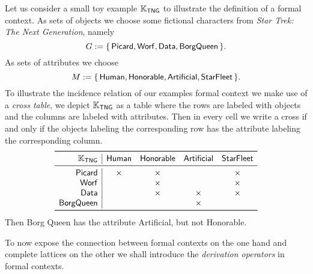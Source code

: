 \begin{Example}
  \label{expl:star-trek}
  Let us consider a small toy example ${\mathbb{K}}_{\mathsf{TNG}}$ to illustrate the definition
  of a formal context.  As sets of objects we choose some fictional characters from
  \emph{Star Trek: The Next Generation}, namely
  \begin{equation*}
    G := {\{\, \mathsf{Picard}, \mathsf{Worf}, \mathsf{Data}, \mathsf{Borg Queen} \,\}}.
  \end{equation*}
  As sets of attributes we choose
  \begin{equation*}
    M := {\{\, \mathsf{Human}, \mathsf{Honorable}, \mathsf{Artificial}, \mathsf{Star
        Fleet} \,\}}.
  \end{equation*}
  To illustrate the incidence relation of our examples formal context we make use of a
  \emph{cross table}, \ie we depict ${\mathbb{K}}_{\mathsf{TNG}}$ as a table where the rows are
  labeled with objects and the columns are labeled with attributes.  Then in every cell we
  write a cross if and only if the objects labeling the corresponding row has the
  attribute labeling the corresponding column.
  \begin{equation*}
    \def\x{\times}
    \begin{array}{r|*{4}{c}}
      \toprule
      \con K_{\mathsf{TNG}} & \mathsf{Human} & \mathsf{Honorable} & \mathsf{Artificial} & \mathsf{Star Fleet} \\
      \midrule
      \mathsf{Picard} & \x & \x & & \x \\
      \mathsf{Worf} & & \x & & \x \\
      \mathsf{Data} & & \x & \x & \x \\
      \mathsf{Borg Queen} & & & \x & \\
      \bottomrule
    \end{array}
  \end{equation*}
  Then \textsf{Borg Queen} has the attribute \textsf{Artificial}, but not \textsf{Honorable}.
\end{Example}

To now expose the connection between formal contexts on the one hand and complete lattices
on the other we shall introduce the \emph{derivation operators} in formal contexts.

